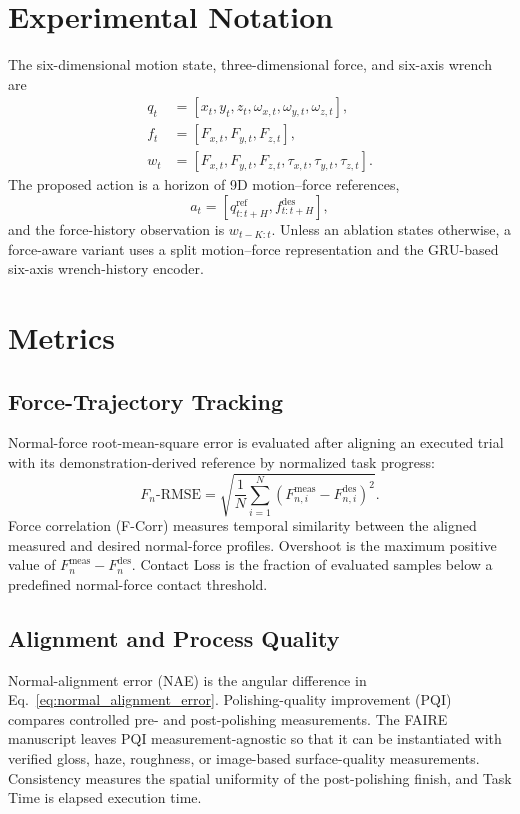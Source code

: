\section{Experimental Notation}
The six-dimensional motion state, three-dimensional force, and six-axis wrench are
\begin{align}
  q_t&=[x_t,y_t,z_t,\omega_{x,t},\omega_{y,t},\omega_{z,t}],\\
  f_t&=[F_{x,t},F_{y,t},F_{z,t}],\\
  w_t&=[F_{x,t},F_{y,t},F_{z,t},\tau_{x,t},\tau_{y,t},\tau_{z,t}].
\end{align}
The proposed action is a horizon of 9D motion--force references,
\begin{equation}
  a_t=[q^{\mathrm{ref}}_{t:t+H},f^{\mathrm{des}}_{t:t+H}],
  \label{eq:experimental_action}
\end{equation}
and the force-history observation is \(w_{t-K:t}\). Unless an ablation states otherwise, a force-aware variant uses a split motion--force representation and the GRU-based six-axis wrench-history encoder.

\section{Metrics}
\subsection{Force-Trajectory Tracking}
Normal-force root-mean-square error is evaluated after aligning an executed trial with its demonstration-derived reference by normalized task progress:
\begin{equation}
  F_n\text{-RMSE}
  =
  \sqrt{\frac{1}{N}\sum_{i=1}^{N}
  \left(F_{n,i}^{\mathrm{meas}}-F_{n,i}^{\mathrm{des}}\right)^2}.
  \label{eq:force_rmse}
\end{equation}
Force correlation (F-Corr) measures temporal similarity between the aligned measured and desired normal-force profiles. Overshoot is the maximum positive value of \(F_n^{\mathrm{meas}}-F_n^{\mathrm{des}}\). Contact Loss is the fraction of evaluated samples below a predefined normal-force contact threshold.

\subsection{Alignment and Process Quality}
Normal-alignment error (NAE) is the angular difference in Eq.~\eqref{eq:normal_alignment_error}. Polishing-quality improvement (PQI) compares controlled pre- and post-polishing measurements. The FAIRE manuscript leaves PQI measurement-agnostic so that it can be instantiated with verified gloss, haze, roughness, or image-based surface-quality measurements. Consistency measures the spatial uniformity of the post-polishing finish, and Task Time is elapsed execution time.

